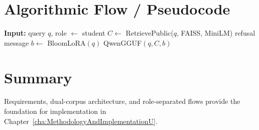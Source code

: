 \section{Algorithmic Flow / Pseudocode}
\begin{algorithm}[H]
\caption{Student RAG query (simplified)}
\begin{algorithmic}[1]
\State \textbf{Input:} query $q$, role $\leftarrow$ student
\State $C \leftarrow$ RetrievePublic($q$, FAISS, MiniLM)
   \State \Return refusal message
\EndIf
\State $b \leftarrow$ BloomLoRA$(q)$ 
\State \Return QwenGGUF$(q, C, b)$
\end{algorithmic}
\end{algorithm}

\section{Summary}
Requirements, dual-corpus architecture, and role-separated flows provide the foundation for implementation in Chapter~\ref{cha:MethodologyAndImplementationU}.
